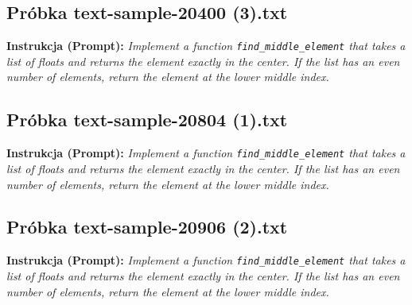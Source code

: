 
\subsection{Próbka text-sample-20400 (3).txt}
\label{sec:lst:text-sample-20400-3}
\textbf{Instrukcja (Prompt):} \textit{Implement a function \texttt{find\_middle\_element} that takes a list of floats and returns the element exactly in the center. If the list has an even number of elements, return the element at the lower middle index.}




\subsection{Próbka text-sample-20804 (1).txt}
\label{sec:lst:text-sample-20804-1}
\textbf{Instrukcja (Prompt):} \textit{Implement a function \texttt{find\_middle\_element} that takes a list of floats and returns the element exactly in the center. If the list has an even number of elements, return the element at the lower middle index.}




\subsection{Próbka text-sample-20906 (2).txt}
\label{sec:lst:text-sample-20906-2}
\textbf{Instrukcja (Prompt):} \textit{Implement a function \texttt{find\_middle\_element} that takes a list of floats and returns the element exactly in the center. If the list has an even number of elements, return the element at the lower middle index.}




